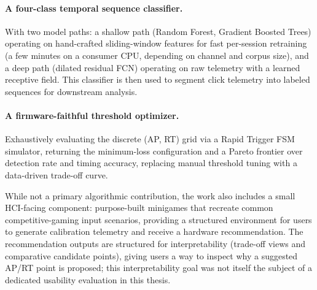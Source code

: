 \paragraph{A four-class temporal sequence classifier.} With two model paths: a shallow
path (Random Forest, Gradient Boosted Trees) operating on hand-crafted
sliding-window features for fast per-session retraining (a few minutes on a
consumer CPU, depending on channel and corpus size), and a deep path
(dilated residual FCN) operating on raw telemetry with a learned receptive field. This classifier is then used to segment click telemetry into labeled sequences for downstream analysis.

\paragraph{A firmware-faithful threshold optimizer.} Exhaustively evaluating the
discrete (AP, RT) grid via a Rapid Trigger FSM simulator, returning the
minimum-loss configuration and a Pareto frontier over detection rate and
timing accuracy, replacing manual threshold tuning with a data-driven
trade-off curve.

While not a primary algorithmic contribution, the work also includes a small HCI-facing component: purpose-built minigames that recreate common competitive-gaming input scenarios, providing a structured environment for users to generate calibration telemetry and receive a hardware recommendation.
The recommendation outputs are structured for interpretability (trade-off views and
comparative candidate points), giving users a way to inspect why a suggested AP/RT point
is proposed; this interpretability goal was not itself the subject of a dedicated
usability evaluation in this thesis.

